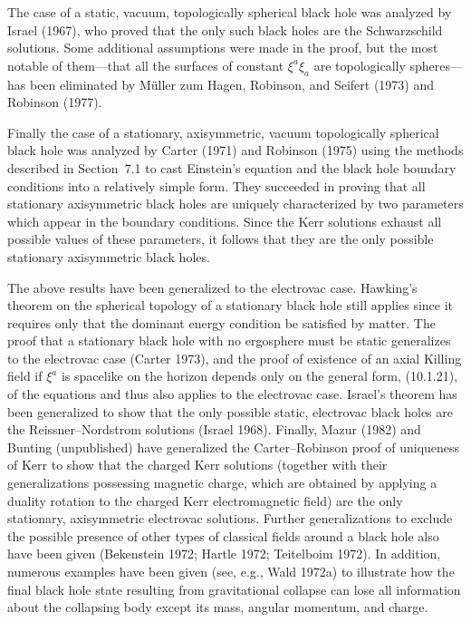 The case of a static, vacuum, topologically spherical black hole was analyzed by
Israel (1967), who proved that the only such black holes are the Schwarzschild
solutions. Some additional assumptions were made in the proof, but the most notable
of them---that all the surfaces of constant \(\xi^a\xi_a\) are topologically
spheres---has been eliminated by Müller zum Hagen, Robinson, and Seifert (1973)
and Robinson (1977).

Finally the case of a stationary, axisymmetric, vacuum topologically spherical black
hole was analyzed by Carter (1971) and Robinson (1975) using the methods described
in Section~7.1 to cast Einstein's equation and the black hole boundary conditions into
a relatively simple form. They succeeded in proving that all stationary axisymmetric
black holes are uniquely characterized by two parameters which appear in the boundary
conditions. Since the Kerr solutions exhaust all possible values of these parameters,
it follows that they are the only possible stationary axisymmetric black holes.

The above results have been generalized to the electrovac case. Hawking's theorem
on the spherical topology of a stationary black hole still applies since it requires only
that the dominant energy condition be satisfied by matter. The proof that a stationary
black hole with no ergosphere must be static generalizes to the electrovac case
(Carter 1973), and the proof of existence of an axial Killing field if \(\xi^a\) is
spacelike on the horizon depends only on the general form, (10.1.21), of the equations
and thus also applies to the electrovac case. Israel's theorem has been generalized to
show that the only possible static, electrovac black holes are the Reissner--Nordstrom
solutions (Israel 1968). Finally, Mazur (1982) and Bunting (unpublished) have
generalized the Carter--Robinson proof of uniqueness of Kerr to show that the charged
Kerr solutions (together with their generalizations possessing magnetic charge, which
are obtained by applying a duality rotation to the charged Kerr electromagnetic field)
are the only stationary, axisymmetric electrovac solutions. Further generalizations to
exclude the possible presence of other types of classical fields around a black hole
also have been given (Bekenstein 1972; Hartle 1972; Teitelboim 1972). In addition,
numerous examples have been given (see, e.g., Wald 1972a) to illustrate how the
final black hole state resulting from gravitational collapse can lose all information
about the collapsing body except its mass, angular momentum, and charge.

